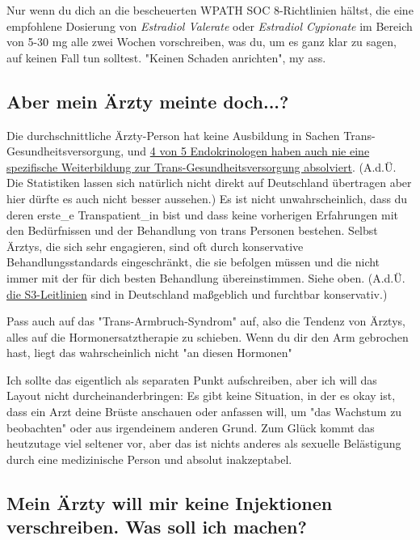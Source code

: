 \documentclass{article}
\begin{document}
																														

Nur wenn du dich an die bescheuerten WPATH SOC 8-Richtlinien hältst, die eine empfohlene Dosierung von \textit{Estradiol Valerate} oder \textit{Estradiol Cypionate} im Bereich von 5-30 mg alle zwei Wochen vorschreiben, was du, um es ganz klar zu sagen, auf keinen Fall tun solltest. "Keinen Schaden anrichten", my ass.

\subsection{Aber mein Ärzty meinte doch...?}

Die durchschnittliche Ärzty-Person hat keine Ausbildung in Sachen Trans-Gesundheitsversorgung, und \href{https://www.endocrine.org/news-and-advocacy/news-room/2017/endocrinologists-want-training-in-transgender-care }{4 von 5 Endokrinologen haben auch nie eine spezifische Weiterbildung zur Trans-Gesundheitsversorgung absolviert}. (A.d.Ü. Die Statistiken lassen sich natürlich nicht direkt auf Deutschland übertragen aber hier dürfte es auch nicht besser aussehen.) Es ist nicht unwahrscheinlich, dass du deren erste\_e Transpatient\_in bist und dass keine vorherigen Erfahrungen mit den Bedürfnissen und der Behandlung von trans Personen bestehen. Selbst Ärztys, die sich sehr engagieren, sind oft durch konservative Behandlungsstandards eingeschränkt, die sie befolgen müssen und die nicht immer mit der für dich besten Behandlung übereinstimmen. Siehe oben. (A.d.Ü. \href{https://schwulenberatungberlin.de/wp-content/uploads/2025/06/AWMF-online_S3_Richtlinie.pdf}{die S3-Leitlinien} sind in Deutschland maßgeblich und furchtbar konservativ.)

Pass auch auf das "Trans-Armbruch-Syndrom" auf, also die Tendenz von Ärztys, alles auf die Hormonersatztherapie zu schieben. Wenn du dir den Arm gebrochen hast, liegt das wahrscheinlich nicht "an diesen Hormonen"

Ich sollte das eigentlich als separaten Punkt aufschreiben, aber ich will das Layout nicht durcheinanderbringen: Es gibt keine Situation, in der es okay ist, dass ein Arzt deine Brüste anschauen oder anfassen will, um "das Wachstum zu beobachten" oder aus irgendeinem anderen Grund. Zum Glück kommt das heutzutage viel seltener vor, aber das ist nichts anderes als sexuelle Belästigung durch eine medizinische Person und absolut inakzeptabel.

\subsection{Mein Ärzty will mir keine Injektionen verschreiben. Was soll ich machen?}
\end{document}
